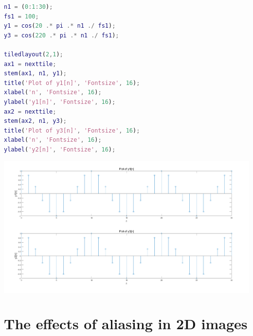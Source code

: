 \documentclass{article}
\begin{document}
\begin{enumerate}
\begin{lstlisting}[language=Matlab]
n1 = (0:1:30);
fs1 = 100;
y1 = cos(20 .* pi .* n1 ./ fs1);
y3 = cos(220 .* pi .* n1 ./ fs1);
    
tiledlayout(2,1);
ax1 = nexttile;
stem(ax1, n1, y1);
title('Plot of y1[n]', 'Fontsize', 16);
xlabel('n', 'Fontsize', 16);
ylabel('y1[n]', 'Fontsize', 16);
ax2 = nexttile;
stem(ax2, n1, y3);
title('Plot of y3[n]', 'Fontsize', 16);
xlabel('n', 'Fontsize', 16);
ylabel('y2[n]', 'Fontsize', 16);
\end{lstlisting}

\includegraphics[width=\textwidth]{Question3C.png}

\end{enumerate}

\section{The effects of aliasing in 2D images}
\end{document}
